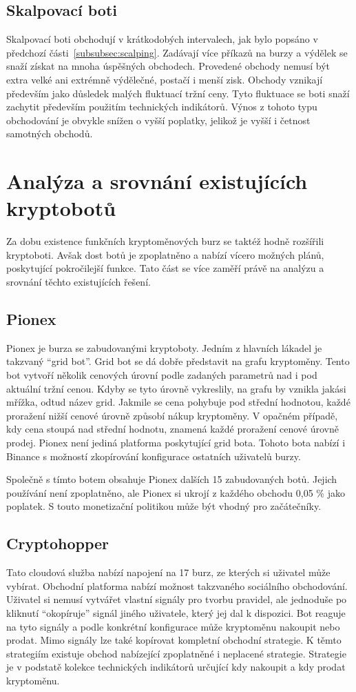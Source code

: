\subsection{Skalpovací boti}
Skalpovací boti obchodují v krátkodobých intervalech, jak bylo popsáno v předchozí části~\ref{subsubsec:scalping}. Zadávají více příkazů na burzy a výdělek se snaží
získat na mnoha úspěšných obchodech. Provedené obchody nemusí být extra velké ani extrémně výdělečné, postačí i menší zisk. Obchody vznikají především jako důsledek
malých fluktuací tržní ceny. Tyto fluktuace se boti snaží zachytit především použitím technických indikátorů. Výnos z tohoto typu obchodování je obvykle snížen o vyšší
poplatky, jelikož je vyšší i četnost samotných obchodů.


\section{Analýza a srovnání existujících kryptobotů}
Za dobu existence funkčních kryptoměnových burz se taktéž hodně rozšířili kryptoboti. Avšak dost botů je zpoplatněno a nabízí vícero možných plánů, poskytující
pokročilejší funkce. Tato část se více zaměří právě na analýzu a srovnání těchto existujících řešení.

\subsection{Pionex}
Pionex je burza se zabudovanými kryptoboty. Jedním z hlavních lákadel je takzvaný \enquote{grid bot}. Grid bot se dá dobře představit na grafu kryptoměny. Tento bot
vytvoří několik cenových úrovní podle zadaných parametrů nad i pod aktuální tržní cenou. Kdyby se tyto úrovně vykreslily, na grafu by vznikla jakási mřížka, odtud název
grid. Jakmile se cena pohybuje pod střední hodnotou, každé proražení nižší cenové úrovně způsobí nákup kryptoměny. V opačném případě, kdy cena stoupá nad střední hodnotu,
znamená každé proražení cenové úrovně prodej. Pionex není jediná platforma poskytující grid bota. Tohoto bota nabízí i Binance s možností zkopírování konfigurace
ostatních uživatelů burzy.

Společně s tímto botem obsahuje Pionex dalších 15 zabudovaných botů. Jejich používání není zpoplatněno, ale Pionex si ukrojí z každého obchodu 0,05 \% jako poplatek.
S touto monetizační politikou může být vhodný pro začátečníky. \cite{pionex}

\subsection{Cryptohopper}
Tato cloudová služba nabízí napojení na 17 burz, ze kterých si uživatel může vybírat. Obchodní platforma nabízí možnost takzvaného sociálního obchodování. Uživatel si
nemusí vytvářet vlastní signály pro tvorbu pravidel, ale jednoduše po kliknutí \enquote{okopíruje} signál jiného uživatele, který jej dal k dispozici. Bot reaguje na tyto
signály a podle konkrétní konfigurace může kryptoměnu nakoupit nebo prodat. Mimo signály lze také kopírovat kompletní obchodní strategie. K těmto strategiím existuje
obchod nabízející zpoplatněné i neplacené strategie. Strategie je v podstatě kolekce technických indikátorů určující kdy nakoupit a kdy prodat kryptoměnu.

